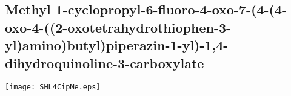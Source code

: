 \subsection{Methyl 1\hyp{}cyclopropyl\hyp{}6\hyp{}fluoro\hyp{}4\hyp{}oxo\hyp{}7\hyp{}(4\hyp{}(4\hyp{}oxo\hyp{}4\hyp{}((2\hyp{}oxotetrahydrothiophen\hyp{}3\hyp{}yl)amino)butyl)piperazin\hyp{}1\hyp{}yl)\hyp{}1,4\hyp{}dihydroquinoline\hyp{}3\hyp{}carboxylate }


\begin{scheme}[H]
	\begin{center}
		\texttt{[image: SHL4CipMe.eps]}
	\end{center}
\end{scheme}

